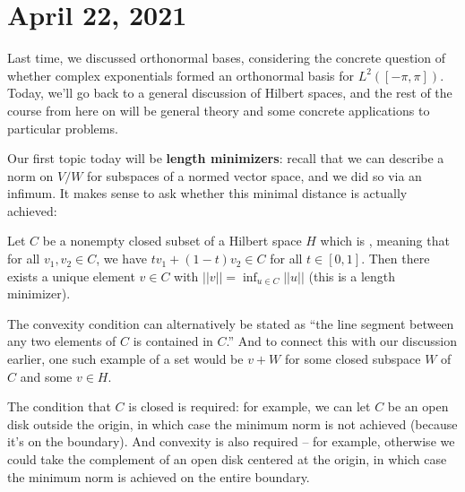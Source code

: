 \pagebreak\section*{April 22, 2021}

Last time, we discussed orthonormal bases, considering the concrete question of whether complex exponentials formed an orthonormal basis for $L^2([-\pi, \pi])$. Today, we'll go back to a general discussion of Hilbert spaces, and the rest of the course from here on will be general theory and some concrete applications to particular problems. 

Our first topic today will be \textbf{length minimizers}: recall that we can describe a norm on $V/W$ for subspaces of a normed vector space, and we did so via an infimum. It makes sense to ask whether this minimal distance is actually achieved:

\begin{theorem}\label{lengthminimizer}
Let $C$ be a nonempty closed subset of a Hilbert space $H$ which is , meaning that for all $v_1, v_2 \in C$, we have $tv_1 + (1-t)v_2 \in C$ for all $t \in [0, 1]$. Then there exists a unique element $v \in C$ with $||v|| = \inf_{u \in C} ||u||$ (this is a length minimizer).
\end{theorem}

The convexity condition can alternatively be stated as ``the line segment between any two elements of $C$ is contained in $C$.'' And to connect this with our discussion earlier, one such example of a set would be $v + W$ for some closed subspace $W$ of $C$ and some $v \in H$. 

\begin{remark}
The condition that $C$ is closed is required: for example, we can let $C$ be an open disk outside the origin, in which case the minimum norm is not achieved (because it's on the boundary). And convexity is also required -- for example, otherwise we could take the complement of an open disk centered at the origin, in which case the minimum norm is achieved on the entire boundary. 
\end{remark} 

